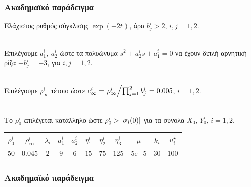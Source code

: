 \documentclass{beamer}
\begin{document}
    \begin{frame}
        \frametitle{Ακαδημαϊκό παράδειγμα}

        Ελάχιστος ρυθμός σύγκλισης $\exp(-2t)$, άρα $b_j^i > 2$, $i,j=1,2$. \\~\
       
        \pause 
        Επιλέγουμε $a_1^i,\ a_2^i$ ώστε τα πολυώνυμα $ s^{2} + a_2^i s + a_1^i = 0$ να έχουν διπλή αρνητική ρίζα $-b_j^i = -3$, για $i,j=1,2$.\\~\
        
        \pause
        Επιλέγουμε $\rho_\infty^i$ τέτοιο ώστε $e_\infty^i = \flatfrac{\rho_\infty^i}{\prod_{j=1}^2 b_j^i} = 0.005$, $i=1,2$.\\~\
        
        \pause
        Το $\rho_0^i$ επιλέγεται κατάλληλο ώστε $\rho_0^i > \abs{\sigma_i(0)}$ για τα σύνολα $X_0$, $Y_0^i$, $i=1,2$.\\
        
        \pause
        \begin{center}
            \begin{tabular}{ccccccccccc}
                \toprule
                $\rho_0^i$ & $\rho_\infty^i$ & $\lambda_i$ & $a_1^i$ & $a_2^i$ & 
                $\eta_1^i$ & $\eta_2^i$ & $\eta_3^i$ & $\mu$ & $k_i$ & 
                $u_i^\star$ \\ \midrule
                $50$ & $0.045$ & $2$ & $9$ & $6$ & $15$ & $75$ & $125$ & 
                $5\mathrm{e}{-5}$ & $30$ & $100$ \\ \bottomrule
            \end{tabular}
        \end{center}
    \end{frame}
    
    
    \begin{frame}
      \frametitle{Ακαδημαϊκό παράδειγμα}
      
%              

    \end{frame}
    
\end{document}
